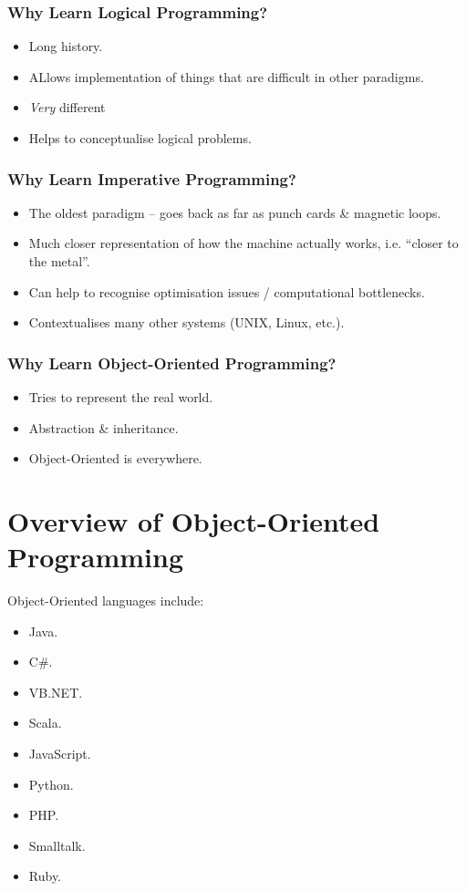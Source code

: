 \documentclass[a4paper,11pt]{article}
\begin{document}
\subsubsection{Why Learn Logical Programming?}
\begin{itemize}
    \item   Long history. 
    \item   ALlows implementation of things that are difficult in other paradigms.
    \item   \emph{Very} different
    \item   Helps to conceptualise logical problems.
\end{itemize}

\subsubsection{Why Learn Imperative Programming?}
\begin{itemize}
    \item   The oldest paradigm -- goes back as far as punch cards \& magnetic loops.
    \item   Much closer representation of how the machine actually works, i.e. ``closer to the metal''.
    \item   Can help to recognise optimisation issues / computational bottlenecks.
    \item   Contextualises many other systems (UNIX, Linux, etc.).
\end{itemize}

\subsubsection{Why Learn Object-Oriented Programming?}
\begin{itemize}
    \item   Tries to represent the real world.
    \item   Abstraction \& inheritance.
    \item   Object-Oriented is everywhere.
\end{itemize}

\section{Overview of Object-Oriented Programming}
Object-Oriented languages include:
\begin{multicols}{2}
\begin{itemize}
    \item   Java.
    \item   C\#.
    \item   VB.NET. 
    \item   Scala. 
    \item   JavaScript. 
    \item   Python.
    \item   PHP. 
    \item   Smalltalk.
    \item   Ruby.
\end{itemize}
\end{multicols}
\end{document}
